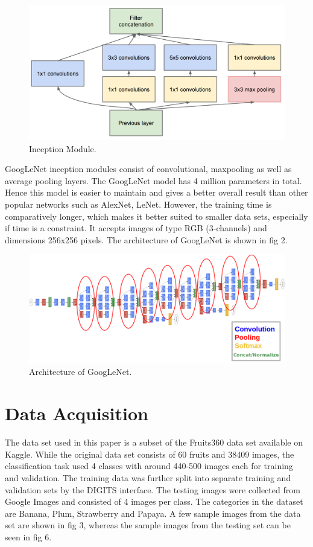 \documentclass[10pt,journal,compsoc]{IEEEtran}
\begin{document}
\begin{figure}[thpb]
      \centering
      \includegraphics[width=\linewidth]{inc.png}
      \caption{Inception Module.}
      \label{fig:robot1}
\end{figure}

GoogLeNet inception modules consist of convolutional, maxpooling as well as average pooling layers. The GoogLeNet model has 4 million parameters in total. Hence this model is easier to maintain and gives a better overall result than other popular networks such as AlexNet, LeNet. However, the training time is comparatively longer, which makes it better suited to smaller data sets, especially if time is a constraint. It accepts images of type RGB (3-channels) and dimensions 256x256 pixels. The architecture of GoogLeNet is shown in fig 2.

\begin{figure}[thpb]
      \centering
      \includegraphics[width=\linewidth]{goog.png}
      \caption{Architecture of GoogLeNet.}
      \label{fig:robot1}
\end{figure}


\section{Data Acquisition}
The data set used in this paper is a subset of the Fruits360 data set available on Kaggle. While the original data set consists of 60 fruits and 38409 images, the classification task used 4 classes with around 440-500 images each for training and validation. The training data was further split into separate training and validation sets by the DIGITS interface.
The testing images were collected from Google Images and consisted of 4 images per class.
The categories in  the dataset are Banana, Plum, Strawberry and Papaya. A few sample images from the data set are shown in fig 3, whereas the sample images from the testing set can be seen in fig 6.
\end{document}
